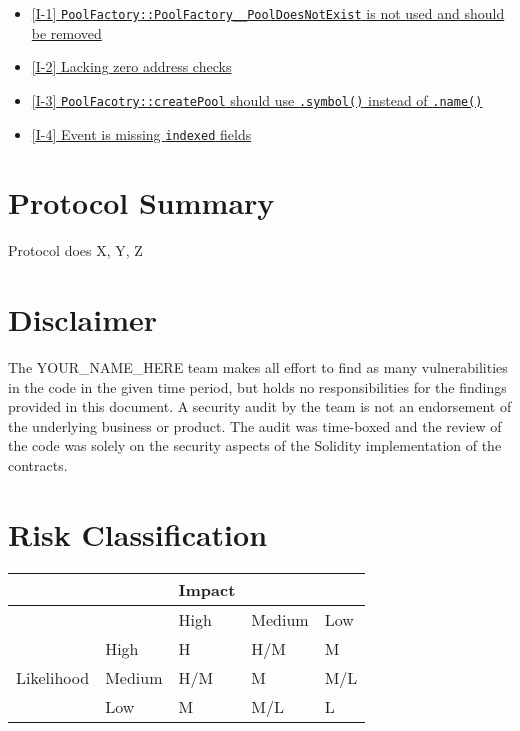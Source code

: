 \begin{itemize}
\begin{itemize}
    \begin{itemize}
    \tightlist
    \item
      \hyperref[i-1-poolfactorypoolfactory__pooldoesnotexist-is-not-used-and-should-be-removed]{{[}I-1{]}
      \texttt{PoolFactory::PoolFactory\_\_PoolDoesNotExist} is not used
      and should be removed}
    \item
      \hyperref[i-2-lacking-zero-address-checks]{{[}I-2{]} Lacking zero
      address checks}
    \item
      \hyperref[i-3-poolfacotrycreatepool-should-use-symbol-instead-of-name]{{[}I-3{]}
      \texttt{PoolFacotry::createPool} should use \texttt{.symbol()}
      instead of \texttt{.name()}}
    \item
      \hyperref[i-4-event-is-missing-indexed-fields]{{[}I-4{]} Event is
      missing \texttt{indexed} fields}
    \end{itemize}
  \end{itemize}
\end{itemize}

\section{Protocol Summary}\label{protocol-summary}

Protocol does X, Y, Z

\section{Disclaimer}\label{disclaimer}

The YOUR\_NAME\_HERE team makes all effort to find as many
vulnerabilities in the code in the given time period, but holds no
responsibilities for the findings provided in this document. A security
audit by the team is not an endorsement of the underlying business or
product. The audit was time-boxed and the review of the code was solely
on the security aspects of the Solidity implementation of the contracts.

\section{Risk Classification}\label{risk-classification}

\begin{longtable}[]{@{}lllll@{}}
\toprule\noalign{}
& & Impact & & \\
\midrule\noalign{}
\endhead
\bottomrule\noalign{}
\endlastfoot
& & High & Medium & Low \\
& High & H & H/M & M \\
Likelihood & Medium & H/M & M & M/L \\
& Low & M & M/L & L \\
\end{longtable}


